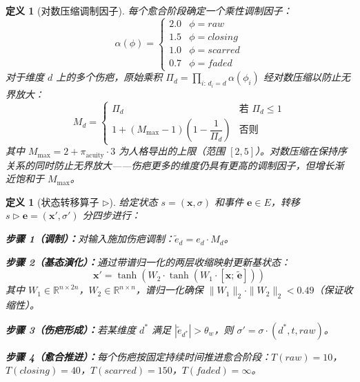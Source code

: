 \documentclass[11pt]{article}
\newtheorem{definition}[theorem]{定义}
\begin{document}
\begin{definition}[对数压缩调制因子]
\label{def:modifier}
每个愈合阶段确定一个乘性调制因子：
\begin{equation}
\alpha(\phi) = \begin{cases} 2.0 & \phi = raw \\ 1.5 & \phi = closing \\ 1.0 & \phi = scarred \\ 0.7 & \phi = faded \end{cases}
\end{equation}
对于维度 $d$ 上的多个伤疤，原始乘积 $\Pi_d = \prod_{i:\, d_i = d} \alpha(\phi_i)$ 经对数压缩以防止无界放大：
\begin{equation}
\label{eq:modifier}
M_d = \begin{cases}
\Pi_d & \text{若 } \Pi_d \leq 1 \\[4pt]
1 + (M_{\max} - 1)\left(1 - \dfrac{1}{\Pi_d}\right) & \text{否则}
\end{cases}
\end{equation}
其中 $M_{\max} = 2 + \pi_{\text{acuity}} \cdot 3$ 为人格导出的上限（范围 $[2, 5]$）。对数压缩在保持序关系的同时防止无界放大——伤疤更多的维度仍具有更高的调制因子，但增长渐近饱和于 $M_{\max}$。
\end{definition}

\begin{definition}[状态转移算子 $\triangleright$]
\label{def:transition}
给定状态 $s = (\mathbf{x}, \sigma)$ 和事件 $\mathbf{e} \in E$，转移 $s \triangleright \mathbf{e} = (\mathbf{x}', \sigma')$ 分四步进行：

\textbf{步骤 1（调制）：}对输入施加伤疤调制：$\tilde{e}_d = e_d \cdot M_d$。

\textbf{步骤 2（基态演化）：}通过带谱归一化的两层收缩映射更新基状态：
\begin{equation}
\label{eq:evolution}
\mathbf{x}' = \tanh(W_2 \cdot \tanh(W_1 \cdot [\mathbf{x};\, \tilde{\mathbf{e}}]))
\end{equation}
其中 $W_1 \in \mathbb{R}^{n \times 2n}$，$W_2 \in \mathbb{R}^{n \times n}$，谱归一化确保 $\|W_1\|_2 \cdot \|W_2\|_2 < 0.49$（保证收缩性）。

\textbf{步骤 3（伤疤形成）：}若某维度 $d^*$ 满足 $|\tilde{e}_{d^*}| > \theta_w$，则 $\sigma' = \sigma \cdot (d^*, t, raw)$。

\textbf{步骤 4（愈合推进）：}每个伤疤按固定持续时间推进愈合阶段：$T(raw)=10$，$T(closing)=40$，$T(scarred)=150$，$T(faded)=\infty$。
\end{definition}
\end{document}
